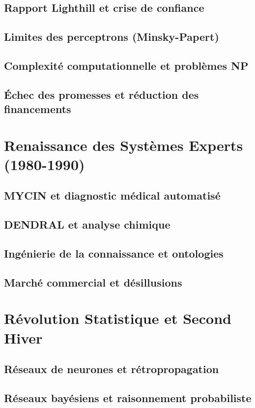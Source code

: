 \documentclass[12pt,a4paper]{book}
\begin{document}
\section{Rapport Lighthill et crise de confiance}
\section{Limites des perceptrons (Minsky-Papert)}
\section{Complexité computationnelle et problèmes NP}
\section{Échec des promesses et réduction des financements}

\chapter{Renaissance des Systèmes Experts (1980-1990)}
\section{MYCIN et diagnostic médical automatisé}
\section{DENDRAL et analyse chimique}
\section{Ingénierie de la connaissance et ontologies}
\section{Marché commercial et désillusions}

\chapter{Révolution Statistique et Second Hiver}
\section{Réseaux de neurones et rétropropagation}
\section{Réseaux bayésiens et raisonnement probabiliste}
\end{document}
